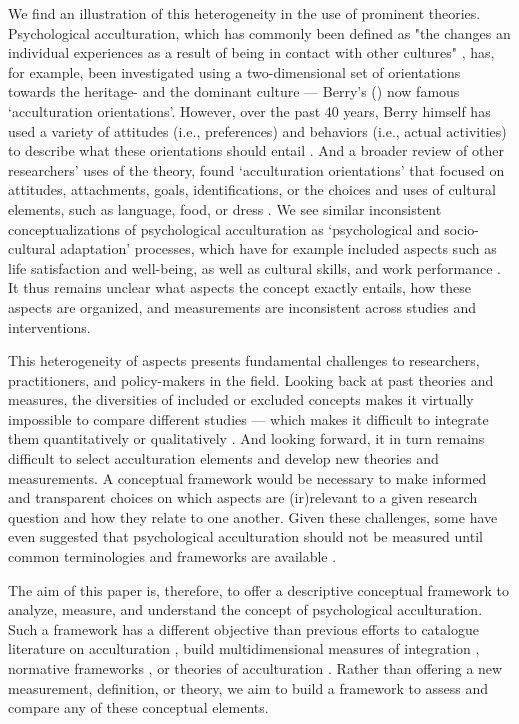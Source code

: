 \documentclass[man, 12pt, a4paper]{apa7}
\begin{document}
We find an illustration of this heterogeneity in the use of prominent theories. Psychological acculturation, which has commonly been defined as "the changes an individual experiences as a result of being in contact with other cultures" \citep[][p. 14]{Sam2006b}, has, for example, been investigated using a two-dimensional set of orientations towards the heritage- and the dominant culture --- Berry's (\citeyear{Berry1980, Berry1997b, Berry2005}) now famous `acculturation orientations'. However, over the past 40 years, Berry himself has used a variety of attitudes (i.e., preferences) and behaviors (i.e., actual activities) to describe what these orientations should entail \citep{Berry2005}. And a broader review of other researchers' uses of the theory, found `acculturation orientations' that focused on attitudes, attachments, goals, identifications, or the choices and uses of cultural elements, such as language, food, or dress \citep[e.g.,][]{Rudmin2003a}. We see similar inconsistent conceptualizations of psychological acculturation as `psychological and socio-cultural adaptation' processes, which have for example included aspects such as life satisfaction and well-being, as well as cultural skills, and work performance \citep{Searle1990, Ward2001, Berry2003}.
It thus remains unclear what aspects the concept exactly entails, how these aspects are organized, and measurements are inconsistent across studies and interventions.

This heterogeneity of aspects presents fundamental challenges to researchers, practitioners, and policy-makers in the field. Looking back at past theories and measures, the diversities of included or excluded concepts makes it virtually impossible to compare different studies --- which makes it difficult to integrate them quantitatively or qualitatively \citep{Taft1981}.
And looking forward, it in turn remains difficult to select acculturation elements and develop new theories and measurements. A conceptual framework would be necessary to make informed and transparent choices on which aspects are (ir)relevant to a given research question and how they relate to one another.
Given these challenges, some have even suggested that psychological acculturation should not be measured until common terminologies and frameworks are available \citep{Escobar2000}.

The aim of this paper is, therefore, to offer a descriptive conceptual framework to analyze, measure, and understand the concept of psychological acculturation. Such a framework has a different objective than previous efforts to catalogue literature on acculturation \citep[e.g.,][]{Castels2003}, build multidimensional measures of integration \citep[e.g.,][]{Harder2018}, normative frameworks \citep[e.g.,][]{Ager2008a}, or theories of acculturation \citep[e.g.,][]{Berry2005}. Rather than offering a new measurement, definition, or theory, we aim to build a framework to assess and compare any of these conceptual elements. 
\end{document}
